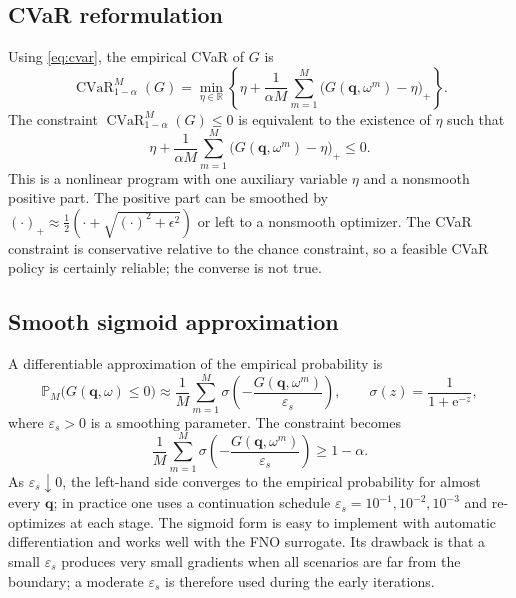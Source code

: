 \documentclass[11pt]{article}
\numberwithin{equation}{section}
\newcommand{\R}{\mathbb{R}}
\newcommand{\Prob}{\mathbb{P}}
\newcommand{\CVaR}{\operatorname{CVaR}}
\newcommand{\ProbM}{\Prob_{M}}
\newcommand{\me}{\mathrm{e}}
\theoremstyle{plain}
\begin{document}
\subsection{CVaR reformulation}

Using \eqref{eq:cvar}, the empirical CVaR of $G$ is
\begin{equation}
\label{eq:cvarM}
\CVaR_{1-\alpha}^M(G)
=\min_{\eta\in\R}\left\{
\eta+\frac{1}{\alpha M}\sum_{m=1}^{M}
\bigl(G(\mathbf{q},\omega^m)-\eta\bigr)_+
\right\}.
\end{equation}
The constraint $\CVaR_{1-\alpha}^M(G)\le0$ is equivalent to the existence of
$\eta$ such that
\begin{equation}
\label{eq:cvarconstraint}
\eta+\frac{1}{\alpha M}\sum_{m=1}^{M}
\bigl(G(\mathbf{q},\omega^m)-\eta\bigr)_+
\le0.
\end{equation}
This is a nonlinear program with one auxiliary variable $\eta$ and a
nonsmooth positive part.  The positive part can be smoothed by
$(\cdot)_+\approx\frac{1}{2}(\cdot+\sqrt{(\cdot)^2+\epsilon^2})$ or left to a
nonsmooth optimizer.  The CVaR constraint is conservative relative to the
chance constraint, so a feasible CVaR policy is certainly reliable; the
converse is not true.

\subsection{Smooth sigmoid approximation}
\label{sec:smooth}

A differentiable approximation of the empirical probability is
\begin{equation}
\label{eq:sigmoid}
\ProbM\bigl(G(\mathbf{q},\omega)\le0\bigr)
\approx\frac{1}{M}\sum_{m=1}^{M}
\sigma\!\left(-\frac{G(\mathbf{q},\omega^m)}{\varepsilon_s}\right),
\qquad
\sigma(z)=\frac{1}{1+\me^{-z}},
\end{equation}
where $\varepsilon_s>0$ is a smoothing parameter.  The constraint becomes
\begin{equation}
\label{eq:sigmoidconstraint}
\frac{1}{M}\sum_{m=1}^{M}
\sigma\!\left(-\frac{G(\mathbf{q},\omega^m)}{\varepsilon_s}\right)
\ge1-\alpha.
\end{equation}
As $\varepsilon_s\downarrow0$, the left-hand side converges to the empirical
probability for almost every $\mathbf{q}$; in practice one uses a continuation
schedule $\varepsilon_s=10^{-1},10^{-2},10^{-3}$ and re-optimizes at each
stage.  The sigmoid form is easy to implement with automatic differentiation
and works well with the FNO surrogate.  Its drawback is that a small
$\varepsilon_s$ produces very small gradients when all scenarios are far from
the boundary; a moderate $\varepsilon_s$ is therefore used during the early
iterations.
\end{document}
